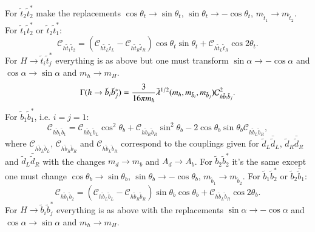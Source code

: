 \documentclass[final,3p,times,pdflatex]{elsarticle}
\begin{document}
For $\tilde{t}_2 {\tilde{t}}_2^*$ make the replacements $\cos\theta_t \rightarrow \sin\theta_t$, $\sin\theta_t \rightarrow -\cos\theta_t$, $m_{\tilde{t}_1} \rightarrow m_{\tilde{t}_2}$.
For $\tilde{t}_1 {\tilde{t}}_2^*$ or $\tilde{t}_2 {\tilde{t}}_1^*$:
\begin{equation}
\mathcal{C}_{h \tilde{t}_{1} \tilde{t}_{2}} = (\mathcal{C}_{h \tilde{t}_{L} \tilde{t}_{L}} - \mathcal{C}_{h \tilde{t}_{R} \tilde{t}_{R}})\cos\theta_t \sin\theta_t + \mathcal{C}_{h \tilde{t}_{L} \tilde{t}_{R}} \cos 2\theta_t.
\end{equation}
For $H \rightarrow \tilde{t}_i {\tilde{t}}_j^*$ everything is as above but one must transform $\sin\alpha \rightarrow -\cos\alpha$ and $\cos\alpha \rightarrow \sin\alpha$ and $m_h \rightarrow m_H$.
\begin{equation}\label{hsbsb}
\Gamma(h \rightarrow \tilde{b}_i {\tilde{b}}_j^*) = {3 \over 16 \pi m_h} \tilde{\lambda}^{1/2}(m_h, m_{\tilde{b}_i}, m_{\tilde{b}_j}) \mathcal{C}_{h \tilde{b}_{i} \tilde{b}_{j}}^2.
\end{equation} 
For $\tilde{b}_1 {\tilde{b}}_1^*$, i.e. $i=j=1$:
\begin{equation}
\mathcal{C}_{h \tilde{b}_{1} \tilde{b}_{1}} = \mathcal{C}_{h \tilde{b}_{L} \tilde{b}_{L}} \cos^2 \theta_b + \mathcal{C}_{h \tilde{b}_{R} \tilde{b}_{R}} \sin^2 \theta_b - 2 \cos\theta_b \sin\theta_b \mathcal{C}_{h \tilde{b}_{L} \tilde{b}_{R}},
\end{equation}
where $\mathcal{C}_{h \tilde{b}_{L} \tilde{b}_{L}}$, $\mathcal{C}_{h \tilde{b}_{R} \tilde{b}_{R}}$ and $\mathcal{C}_{h \tilde{b}_{L} \tilde{b}_{R}}$ correspond to the couplings given for $\tilde{d}_L \bar{\tilde{d}}_L$, $\tilde{d}_R \bar{\tilde{d}}_R$ and $\tilde{d}_L \bar{\tilde{d}}_R$ with the changes $m_d \rightarrow m_b$ and $A_d \rightarrow A_b$.
For $\tilde{b}_2 {\tilde{b}}_2^*$ it's the same except one must change $\cos\theta_b \rightarrow \sin\theta_b$, $\sin\theta_b \rightarrow -\cos\theta_b$, $m_{\tilde{b}_1} \rightarrow m_{\tilde{b}_2}$.
For $\tilde{b}_1 {\tilde{b}}_2^*$ or $\tilde{b}_2 \bar{\tilde{b}}_1$:
\begin{equation}
\mathcal{C}_{h \tilde{b}_{1} \tilde{b}_{2}} = (\mathcal{C}_{h \tilde{b}_{L} \tilde{b}_{L}} - \mathcal{C}_{h \tilde{b}_{R} \tilde{b}_{R}})\sin\theta_b \cos\theta_b + \mathcal{C}_{h \tilde{b}_{L} \tilde{b}_{R}} \cos 2\theta_b.
\end{equation}
For $H \rightarrow \tilde{b}_i {\tilde{b}}_j^*$ everything is as above with the replacements $\sin\alpha \rightarrow -\cos\alpha$ and $\cos\alpha \rightarrow \sin\alpha$ and $m_h \rightarrow m_H$.
\end{document}
